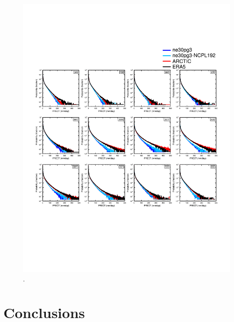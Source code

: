 \documentclass[draft]{agujournal2019}
\begin{document}

\begin{figure}[t]
\begin{center}
         \includegraphics[width=130mm]{figs/temp_composite_ge45N_pdf.pdf}
\end{center}
\caption{.}
\label{fig:comp-pdf}
\end{figure}

\section{Conclusions}\label{sec:conclusions}
\end{document}
